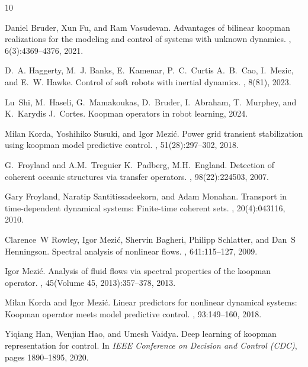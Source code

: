 \documentclass[pdflatex,sn-mathphys]{sn-jnl}%
\theoremstyle{thmstyleone}%
\theoremstyle{thmstyletwo}%
\theoremstyle{thmstylethree}%
\begin{document}

%
\begin{thebibliography}{10}

Daniel Bruder, Xun Fu, and Ram Vasudevan.
\newblock Advantages of bilinear koopman realizations for the modeling and control of systems with unknown dynamics.
, 6(3):4369--4376, 2021.

D.~A. Haggerty, M.~J. Banks, E.~Kamenar, P.~C.~Curtis A.~B.~Cao, I.~Mezic, and E.~W. Hawke.
\newblock Control of soft robots with inertial dynamics.
, 8(81), 2023.

Lu~Shi, M.~Haseli, G.~Mamakoukas, D.~Bruder, I.~Abraham, T.~Murphey, and K.~Karydis J.~Cortes.
\newblock Koopman operators in robot learning, 2024.

Milan Korda, Yoshihiko Susuki, and Igor Mezić.
\newblock Power grid transient stabilization using koopman model predictive control.
, 51(28):297--302, 2018.

G.~Froyland and A.M.~Treguier K.~Padberg, M.H.~England.
\newblock Detection of coherent oceanic structures via transfer operators.
, 98(22):224503, 2007.

Gary Froyland, Naratip Santitissadeekorn, and Adam Monahan.
\newblock Transport in time-dependent dynamical systems: Finite-time coherent sets.
, 20(4):043116, 2010.

Clarence~W Rowley, Igor Mezi{\'c}, Shervin Bagheri, Philipp Schlatter, and Dan~S Henningson.
\newblock Spectral analysis of nonlinear flows.
, 641:115--127, 2009.

Igor Mezić.
\newblock Analysis of fluid flows via spectral properties of the koopman operator.
, 45(Volume 45, 2013):357--378, 2013.

Milan Korda and Igor Mezi{\'c}.
\newblock Linear predictors for nonlinear dynamical systems: {K}oopman operator meets model predictive control.
, 93:149--160, 2018.

Yiqiang Han, Wenjian Hao, and Umesh Vaidya.
\newblock Deep learning of koopman representation for control.
\newblock In {\em IEEE Conference on Decision and Control (CDC)}, pages 1890--1895, 2020.


\end{thebibliography}
\end{document}
